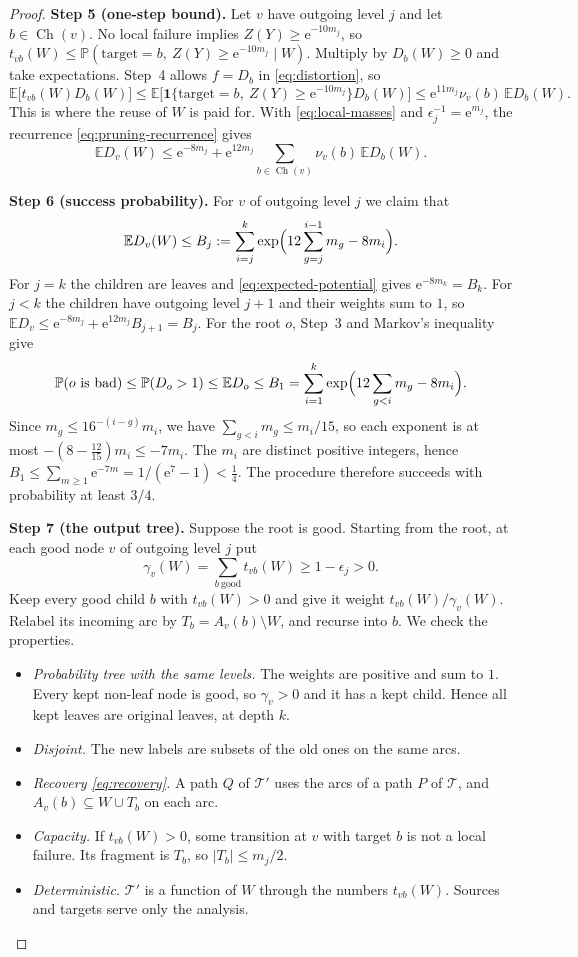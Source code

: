 \documentclass[11pt]{article}
\numberwithin{equation}{section}
\newcommand{\PP}{\mathbb P}
\newcommand{\EE}{\mathbb E}
\newcommand{\ind}{\mathbf 1}
\newcommand{\TT}{\mathcal T}
\newcommand{\ch}{\operatorname{Ch}}
\newcommand{\ee}{\mathrm e}
\newcommand{\Step}[1]{\par\smallskip\noindent\textbf{Step #1.}}
\begin{document}
\begin{proof}
\Step{5 (one-step bound)} Let $v$ have outgoing level $j$ and let $b\in\ch(v)$.
No local failure implies $Z(Y)\ge\ee^{-10m_j}$, so
$t_{vb}(W)\le\PP(\mathrm{target}=b,\ Z(Y)\ge\ee^{-10m_j}\mid W)$. Multiply by
$D_b(W)\ge0$ and take expectations. Step~4 allows $f=D_b$ in
\eqref{eq:distortion}, so
\[
 \EE\bigl[t_{vb}(W)D_b(W)\bigr]
 \le\EE\bigl[\ind\{\mathrm{target}=b,\ Z(Y)\ge\ee^{-10m_j}\}D_b(W)\bigr]
 \le\ee^{11m_j}\nu_v(b)\,\EE D_b(W).
\]
This is where the reuse of $W$ is paid for. With \eqref{eq:local-masses} and
$\epsilon_j^{-1}=\ee^{m_j}$, the recurrence \eqref{eq:pruning-recurrence} gives
\begin{equation}\label{eq:expected-potential}
 \EE D_v(W)\le\ee^{-8m_j}+\ee^{12m_j}\sum_{b\in\ch(v)}\nu_v(b)\,\EE D_b(W).
\end{equation}

\Step{6 (success probability)} For $v$ of outgoing level $j$ we claim that
\[
 \EE D_v(W)\le B_j:=\sum_{i=j}^k\exp\Bigl(12\sum_{g=j}^{i-1}m_g-8m_i\Bigr).
\]
For $j=k$ the children are leaves and \eqref{eq:expected-potential} gives
$\ee^{-8m_k}=B_k$. For $j<k$ the children have outgoing level $j+1$ and their
weights sum to $1$, so
$\EE D_v\le\ee^{-8m_j}+\ee^{12m_j}B_{j+1}=B_j$. For the root $o$, Step~3 and
Markov's inequality give
\[
 \PP(o\text{ is bad})\le\PP(D_o>1)\le\EE D_o\le B_1
 =\sum_{i=1}^k\exp\Bigl(12\sum_{g<i}m_g-8m_i\Bigr).
\]
Since $m_g\le16^{-(i-g)}m_i$, we have $\sum_{g<i}m_g\le m_i/15$, so each
exponent is at most $-(8-\frac{12}{15})m_i\le-7m_i$. The $m_i$ are distinct
positive integers, hence $B_1\le\sum_{m\ge1}\ee^{-7m}=1/(\ee^7-1)<\frac14$. The
procedure therefore succeeds with probability at least $3/4$.

\Step{7 (the output tree)} Suppose the root is good. Starting from the root,
at each good node $v$ of outgoing level $j$ put
\[
 \gamma_v(W)=\sum_{b\ \mathrm{good}}t_{vb}(W)\ge1-\epsilon_j>0 .
\]
Keep every good child $b$ with $t_{vb}(W)>0$ and give it weight
$t_{vb}(W)/\gamma_v(W)$. Relabel its incoming arc by $T_b=A_v(b)\setminus W$,
and recurse into $b$. We check the properties.
\begin{itemize}[leftmargin=1.5em,itemsep=1pt]
\item \emph{Probability tree with the same levels.} The weights are positive
and sum to $1$. Every kept non-leaf node is good, so $\gamma_v>0$ and it has a
kept child. Hence all kept leaves are original leaves, at depth $k$.
\item \emph{Disjoint.} The new labels are subsets of the old ones on the same arcs.
\item \emph{Recovery \eqref{eq:recovery}.} A path $Q$ of $\TT'$ uses the arcs
of a path $P$ of $\TT$, and $A_v(b)\subseteq W\cup T_b$ on each arc.
\item \emph{Capacity.} If $t_{vb}(W)>0$, some transition at $v$ with target
$b$ is not a local failure. Its fragment is $T_b$, so $|T_b|\le m_j/2$.
\item \emph{Deterministic.} $\TT'$ is a function of $W$ through the numbers
$t_{vb}(W)$. Sources and targets serve only the analysis.
\end{itemize}


\end{proof}
\end{document}
